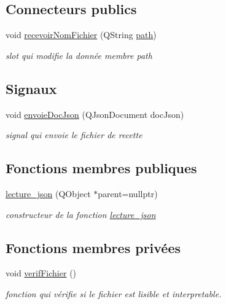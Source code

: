 \subsection*{Connecteurs publics}
\begin{DoxyCompactItemize}
\item 
void \hyperlink{classlecture__json_a539bb092addd4ee4c75834e4ca413ee7}{recevoir\+Nom\+Fichier} (Q\+String \hyperlink{classlecture__json_addfbc41d56e266180e4a120ba3cd1c61}{path})
\begin{DoxyCompactList}\small\item\em slot qui modifie la donnée membre path \end{DoxyCompactList}\end{DoxyCompactItemize}
\subsection*{Signaux}
\begin{DoxyCompactItemize}
\item 
void \hyperlink{classlecture__json_a62f7f4bea2c9579c37bea5b14177a5db}{envoie\+Doc\+Json} (Q\+Json\+Document doc\+Json)
\begin{DoxyCompactList}\small\item\em signal qui envoie le fichier de recette \end{DoxyCompactList}\end{DoxyCompactItemize}
\subsection*{Fonctions membres publiques}
\begin{DoxyCompactItemize}
\item 
\hyperlink{classlecture__json_a4b8226b61ad6f1112038dde13e207b4f}{lecture\+\_\+json} (Q\+Object $\ast$parent=nullptr)
\begin{DoxyCompactList}\small\item\em constructeur de la fonction \hyperlink{classlecture__json}{lecture\+\_\+json} \end{DoxyCompactList}\end{DoxyCompactItemize}
\subsection*{Fonctions membres privées}
\begin{DoxyCompactItemize}
\item 
void \hyperlink{classlecture__json_a88650de275287dc5ddd31f50bdd6d767}{verif\+Fichier} ()
\begin{DoxyCompactList}\small\item\em fonction qui vérifie si le fichier est lisible et interpretable. \end{DoxyCompactList}\end{DoxyCompactItemize}
